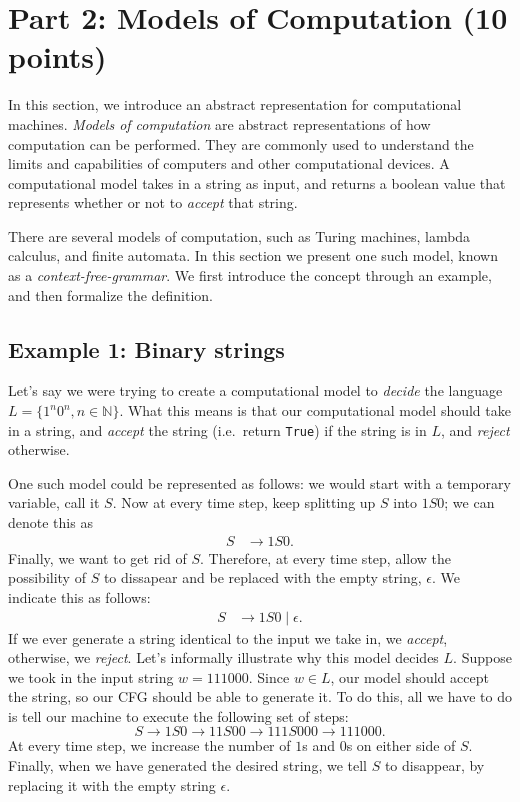 \documentclass{article}
\begin{document}
\section*{Part 2: Models of Computation (10 points)}
    In this section, we introduce an abstract representation for computational machines. \textit{Models of computation} are abstract representations of how computation can be performed. They are commonly used to understand the limits and capabilities of computers and other computational devices. A computational model takes in a string as input, and returns a boolean value that represents whether or not to \textit{accept} that string.

    \vspace{3mm}
    There are several models of computation, such as Turing machines, lambda calculus, and finite automata. In this section we present one such model, known as a \textit{context-free-grammar}. We first introduce the concept through an example, and then formalize the definition.
    
\subsection*{Example 1: Binary strings}
    Let's say we were trying to create a computational model to \textit{decide} the language $L = \{1^{n}0^{n}, n \in \mathbb{N}\}$. What this means is that our computational model should take in a string, and \textit{accept} the string (i.e.\ return \texttt{True}) if the string is in $L$, and \textit{reject} otherwise.

    \vspace{2mm}
    One such model could be represented as follows: we would start with a temporary variable, call it $S$. Now at every time step, keep splitting up $S$ into $1S0$; we can denote this as
    \begin{align*}
        S &\rightarrow 1S0.
    \end{align*}
    Finally, we want to get rid of $S$. Therefore, at every time step, allow the possibility of $S$ to dissapear and be replaced with the empty string, $\epsilon$. We indicate this as follows:
    \begin{align*}
        S &\rightarrow 1S0 \mid \epsilon.
    \end{align*}
    If we ever generate a string identical to the input we take in, we \textit{accept}, otherwise, we \textit{reject}. Let's informally illustrate why this model decides $L$. Suppose we took in the input string $w = 111000$. Since $w \in L$, our model should accept the string, so our CFG should be able to generate it. To do this, all we have to do is tell our machine to execute the following set of steps:
    $$S \rightarrow 1S0 \rightarrow 11S00 \rightarrow 111S000 \rightarrow 111000.$$ At every time step, we increase the number of $1$s and $0$s on either side of $S$. Finally, when we have generated the desired string, we tell $S$ to disappear, by replacing it with the empty string $\epsilon$.
\end{document}
